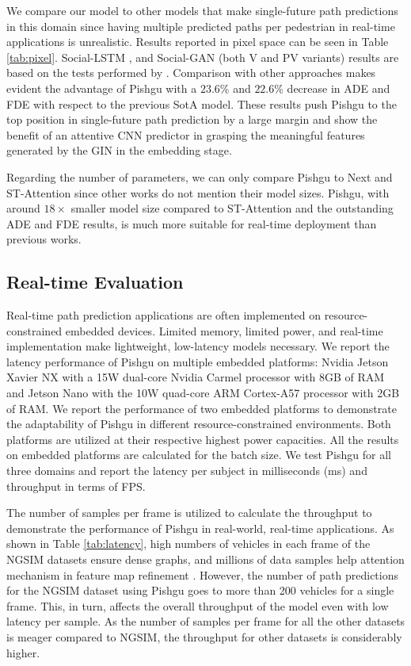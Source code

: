 \documentclass[sigconf]{acmart}
\begin{document}
We compare our model to other models that make single-future path predictions in this domain since having multiple predicted paths per pedestrian in real-time applications is unrealistic. Results reported in pixel space can be seen in Table \ref{tab:pixel}. Social-LSTM \cite{alahi2016social}, and Social-GAN (both V and PV variants) results are based on the tests performed by \cite{liang2019peeking}. Comparison with other approaches makes evident the advantage of Pishgu with a $23.6\%$ and $22.6\%$ decrease in ADE and FDE with respect to the previous SotA model. These results push Pishgu to the top position in single-future path prediction by a large margin and show the benefit of an attentive CNN predictor in grasping the meaningful features generated by the GIN in the embedding stage.

Regarding the number of parameters, we can only compare Pishgu to Next \cite{liang2019peeking} and ST-Attention \cite{zhao2020spatial} since other works do not mention their model sizes. Pishgu, with around $18\times$ smaller model size compared to ST-Attention and the outstanding ADE and FDE results, is much more suitable for real-time deployment than previous works. 

\subsection{Real-time Evaluation} \label{sec:realtime}



Real-time path prediction applications are often implemented on resource-constrained embedded devices. Limited memory, limited power, and real-time implementation make lightweight, low-latency models necessary. We report the latency performance of Pishgu on multiple embedded platforms: Nvidia Jetson Xavier NX with a 15W dual-core Nvidia Carmel processor with 8GB of RAM and Jetson Nano with the 10W quad-core ARM Cortex-A57 processor with 2GB of RAM. We report the performance of two embedded platforms to demonstrate the adaptability of Pishgu in different resource-constrained environments. Both platforms are utilized at their respective highest power capacities. All the results on embedded platforms are calculated for the batch size. We test Pishgu for all three domains and report the latency per subject in milliseconds (ms) and throughput in terms of FPS.

The number of samples per frame is utilized to calculate the throughput to demonstrate the performance of Pishgu in real-world, real-time applications. As shown in Table \ref{tab:latency}, high numbers of vehicles in each frame of the NGSIM datasets ensure dense graphs, and millions of data samples help attention mechanism in feature map refinement \cite{cbam18}. However, the number of path predictions for the NGSIM dataset using Pishgu goes to more than 200 vehicles for a single frame. This, in turn, affects the overall throughput of the model even with low latency per sample. As the number of samples per frame for all the other datasets is meager compared to NGSIM, the throughput for other datasets is considerably higher. 
\end{document}
